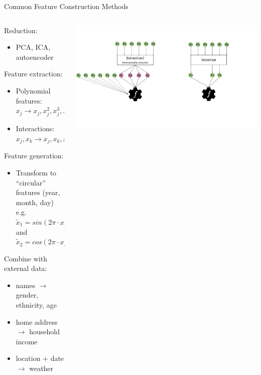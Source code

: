 \begin{frame}{Common Feature Construction Methods}
  \begin{columns}
    \begin{column}{0.6\textwidth}
    Reduction:
    \begin{itemize}
      \item PCA, ICA, autoencoder
    \end{itemize}

    Feature extraction:
    \begin{itemize}
      \item Polynomial features: $x_j \longrightarrow x_j, x_j^2, x_j^3, ...$
      \item Interactions: $x_j, x_k \longrightarrow x_j, x_k, x_j \cdot x_k$
    \end{itemize}

    Feature generation:
    \begin{itemize}
      \item Transform to ``circular'' features (year, month, day) \\
      e.g.\ $\tilde x_1 = sin(2\pi \cdot x /24)$ and $\tilde x_2 = cos(2\pi \cdot x /24)$
    \end{itemize}
    
    Combine with external data:
    \begin{itemize}
      \item names $\longrightarrow$ gender, ethnicity, age
      \item home address $\longrightarrow$ household income
      \item location + date $\longrightarrow$ weather
    \end{itemize}

    \end{column}%
    \begin{column}{0.4\textwidth}
      \begin{center}
        \includegraphics[width= \textwidth, trim=0 100 390 60, clip]{images/feat_extr_vs_selection.pdf}
      \end{center}
    \end{column}
  \end{columns}
    
\end{frame}


